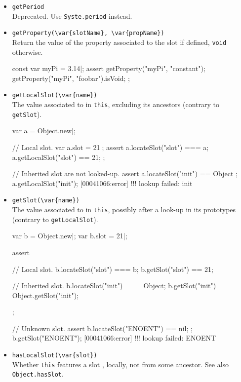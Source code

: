 \begin{itemize}
\item \lstinline|getPeriod|\\
  Deprecated.  Use \lstinline|Syste.period| instead.

\item \lstinline|getProperty(\var{slotName}, \var{propName})|\\
  Return the value of the  property associated to the
  slot  if defined, \lstinline|void| otherwise.
\begin{urbiscript}
const var myPi = 3.14|;
assert
{
  getProperty("myPi", "constant");
  getProperty("myPi", "foobar").isVoid;
};
\end{urbiscript}

\item \lstinline|getLocalSlot(\var{name})|\\
  The value associated to  in \lstinline|this|, excluding
  its ancestors (contrary to \lstinline|getSlot|).

\begin{urbiscript}
var a = Object.new|;

// Local slot.
var a.slot = 21|;
assert
{
  a.locateSlot("slot") === a;
  a.getLocalSlot("slot") == 21;
};

// Inherited slot are not looked-up.
assert { a.locateSlot("init") == Object };
a.getLocalSlot("init");
[00041066:error] !!! lookup failed: init
\end{urbiscript}

\item \lstinline|getSlot(\var{name})|\\
  The value associated to  in \lstinline|this|, possibly
  after a look-up in its prototypes (contrary to
  \lstinline|getLocalSlot|).

\begin{urbiscript}
var b = Object.new|;
var b.slot = 21|;

assert
{
  // Local slot.
  b.locateSlot("slot") === b;
  b.getSlot("slot") == 21;

  // Inherited slot.
  b.locateSlot("init") === Object;
  b.getSlot("init") == Object.getSlot("init");
};

// Unknown slot.
assert { b.locateSlot("ENOENT") == nil; };
b.getSlot("ENOENT");
[00041066:error] !!! lookup failed: ENOENT
\end{urbiscript}

\item \lstinline|hasLocalSlot(\var{slot})|\\
  Whether \lstinline|this| features a slot , locally, not
  from some ancestor.  See also \lstinline|Object.hasSlot|.


\end{itemize}
